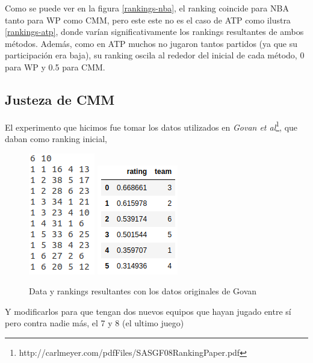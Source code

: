 \documentclass[a4paper]{article}
\begin{document}
Como se puede ver en la figura \ref{rankings-nba}, el ranking coincide para NBA tanto para WP como CMM, pero este este no es el caso de ATP como ilustra \ref{rankings-atp}, donde varían significativamente los rankings resultantes de ambos métodos. Además, como en ATP muchos no jugaron tantos partidos (ya que su participación era baja), su ranking oscila al rededor del inicial de cada método, 0 para WP y 0.5 para CMM.

\subsection{Justeza de CMM}

El experimento que hicimos fue tomar los datos utilizados en \textit{Govan et al}\footnote{http://carlmeyer.com/pdfFiles/SASGF08RankingPaper.pdf}, que daban como ranking inicial,

\begin{figure}[H]
    \begin{center}
        \includegraphics[scale=0.6]{img/justo/govan-orig.png}
        \includegraphics[scale=0.75]{img/justo/govan-rating-original.png}
        \caption{Data y rankings resultantes con los datos originales de Govan}
        \label{govan-orig}
    \end{center}
\end{figure}

Y modificarlos para que tengan dos nuevos equipos que hayan jugado entre sí pero contra nadie más, el 7 y 8 (el ultimo juego)
\end{document}
